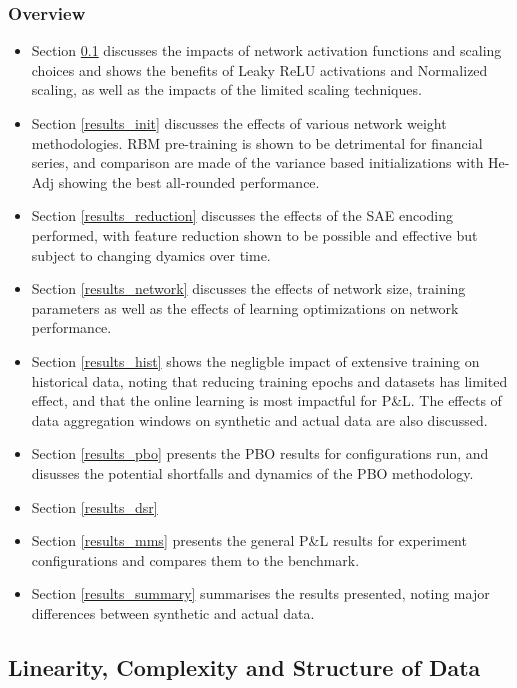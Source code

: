 \documentclass[a4paper,11pt,oneside]{article}
\theoremstyle{plain}
\theoremstyle{definition}
\begin{document}
	\subsubsection{Overview}
	
	\begin{itemize}
		\item[1] Section \ref{results_linearity} discusses the impacts of network activation functions and scaling choices and shows the benefits of Leaky ReLU activations and Normalized scaling, as well as the impacts of the limited scaling techniques.
		\item[2] Section \ref{results_init} discusses the effects of various network weight methodologies. RBM pre-training is shown to be detrimental for financial series, and comparison are made of the variance based initializations with He-Adj showing the best all-rounded performance.
		\item[3] Section \ref{results_reduction} discusses the effects of the SAE encoding performed, with feature reduction shown to be possible and effective but subject to changing dyamics over time.
		\item[4] Section \ref{results_network} discusses the effects of network size, training parameters as well as the effects of learning optimizations on network performance.
		\item[5] Section \ref{results_hist} shows the negligble impact of extensive training on historical data, noting that reducing training epochs and datasets has limited effect, and that the online learning is most impactful for P\&L. The effects of data aggregation windows on synthetic and actual data are also discussed.
		\item[6] Section \ref{results_pbo} presents the PBO results for configurations run, and disusses the potential shortfalls and dynamics of the PBO methodology.
		\item[7] Section \ref{results_dsr} 
		\item[8] Section \ref{results_mms} presents the general P\&L results for experiment configurations and compares them to the benchmark.
		\item[9] Section \ref{results_summary} summarises the results presented, noting major differences between synthetic and actual data.
	\end{itemize}
	
	\newpage
	\subsection{Linearity, Complexity and Structure of Data}\label{results_linearity}
	
\end{document}
